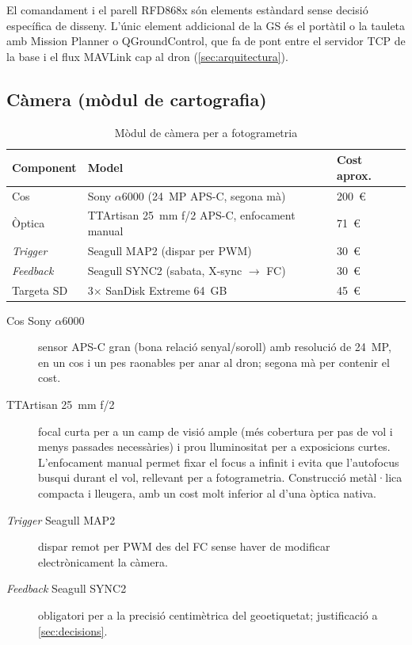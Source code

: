 El comandament i el parell RFD868x són elements estàndard sense decisió específica de disseny. L'únic element addicional de la GS és el portàtil o la tauleta amb Mission Planner o QGroundControl, que fa de pont entre el servidor TCP de la base i el flux MAVLink cap al dron (\cref{sec:arquitectura}).

\subsection{Càmera (mòdul de cartografia)}

\begin{table}[H]
    \centering
    \caption{Mòdul de càmera per a fotogrametria}
    \label{tab:materials-camera}
    \begin{tabular}{lll}
        \toprule
        Component & Model & Cost aprox. \\
        \midrule
        Cos & Sony $\alpha$6000 (24~MP APS-C, segona mà) & 200~€ \\
        Òptica & TTArtisan 25~mm f/2 APS-C, enfocament manual & 71~€ \\
        \emph{Trigger} & Seagull MAP2 (dispar per PWM) & 30~€ \\
        \emph{Feedback} & Seagull SYNC2 (sabata, X-sync $\rightarrow$ FC) & 30~€ \\
        Targeta SD & 3$\times$ SanDisk Extreme 64~GB & 45~€ \\
        \bottomrule
    \end{tabular}
\end{table}

\begin{description}
    \item[Cos Sony $\alpha$6000] sensor APS-C gran (bona relació senyal/soroll) amb resolució de 24~MP, en un cos i un pes raonables per anar al dron; segona mà per contenir el cost.
    \item[TTArtisan 25~mm f/2] focal curta per a un camp de visió ample (més cobertura per pas de vol i menys passades necessàries) i prou lluminositat per a exposicions curtes. L'enfocament manual permet fixar el focus a infinit i evita que l'autofocus busqui durant el vol, rellevant per a fotogrametria. Construcció metàl·lica compacta i lleugera, amb un cost molt inferior al d'una òptica nativa.
    \item[\emph{Trigger} Seagull MAP2] dispar remot per PWM des del FC sense haver de modificar electrònicament la càmera.
    \item[\emph{Feedback} Seagull SYNC2] obligatori per a la precisió centimètrica del geoetiquetat; justificació a \cref{sec:decisions}.
\end{description}

